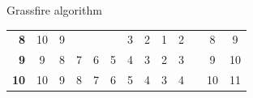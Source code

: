 \documentclass[compress,xcolor=table]{beamer}
\begin{document}
\begin{frame}{Grassfire algorithm}
\begin{center}
{\begin{tabular}{rcccccccccccc}
                \multicolumn{1}{r|}{\textbf{8}}  & \multicolumn{1}{c|}{10}        & \multicolumn{1}{c|}{9}                         & \multicolumn{1}{c|}{\cellcolor[HTML]{000000}}  & \multicolumn{1}{c|}{\cellcolor[HTML]{000000}}  & \multicolumn{1}{c|}{\cellcolor[HTML]{000000}}  & \multicolumn{1}{c|}{3}                         & \multicolumn{1}{c|}{2}                         & \multicolumn{1}{c|}{1}                         & \multicolumn{1}{c|}{2}                        & \multicolumn{1}{c|}{\cellcolor[HTML]{000000}} & \multicolumn{1}{c|}{8}                        & \multicolumn{1}{c|}{9}         \\ \cline{2-13} 
                \multicolumn{1}{r|}{\textbf{9}}  & \multicolumn{1}{c|}{9}         & \multicolumn{1}{c|}{8}                         & \multicolumn{1}{c|}{7}                         & \multicolumn{1}{c|}{6}                         & \multicolumn{1}{c|}{5}                         & \multicolumn{1}{c|}{4}                         & \multicolumn{1}{c|}{3}                         & \multicolumn{1}{c|}{2}                         & \multicolumn{1}{c|}{3}                        & \multicolumn{1}{c|}{\cellcolor[HTML]{000000}} & \multicolumn{1}{c|}{9}                        & \multicolumn{1}{c|}{10}        \\ \cline{2-13} 
                \multicolumn{1}{r|}{\textbf{10}} & \multicolumn{1}{c|}{10}        & \multicolumn{1}{c|}{9}                         & \multicolumn{1}{c|}{8}                         & \multicolumn{1}{c|}{7}                         & \multicolumn{1}{c|}{6}                         & \multicolumn{1}{c|}{5}                         & \multicolumn{1}{c|}{4}                         & \multicolumn{1}{c|}{3}                         & \multicolumn{1}{c|}{4}                        & \multicolumn{1}{c|}{\cellcolor[HTML]{000000}} & \multicolumn{1}{c|}{10}                       & \multicolumn{1}{c|}{11}        \\ \cline{2-13} 
            \end{tabular}
        }
    \end{center}

\end{frame}

\end{document}
